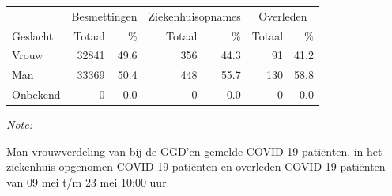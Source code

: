 \documentclass[
  english,
  man,floatsintext]{apa6}
\begin{document}
\begin{table}
\centering\begingroup\fontsize{11}{13}\selectfont

\begin{threeparttable}
\begin{tabular}{lrrrrrr}
\toprule
\multicolumn{1}{c}{ } & \multicolumn{2}{c}{Besmettingen} & \multicolumn{2}{c}{Ziekenhuisopnames} & \multicolumn{2}{c}{Overleden} \\
\cmidrule(l{3pt}r{3pt}){2-3} \cmidrule(l{3pt}r{3pt}){4-5} \cmidrule(l{3pt}r{3pt}){6-7}
Geslacht & Totaal & \% & Totaal & \% & Totaal & \%\\
\midrule
Vrouw & 32841 & 49.6 & 356 & 44.3 & 91 & 41.2\\
Man & 33369 & 50.4 & 448 & 55.7 & 130 & 58.8\\
Onbekend & 0 & 0.0 & 0 & 0.0 & 0 & 0.0\\
\bottomrule
\end{tabular}
\begin{tablenotes}
\item \textit{Note: } 
\item Man-vrouwverdeling van bij de GGD’en gemelde COVID-19 patiënten, in het ziekenhuis opgenomen COVID-19 patiënten en overleden COVID-19 patiënten van 09 mei t/m 23 mei 10:00 uur.
\end{tablenotes}
\end{threeparttable}
\endgroup{}
\end{table}
\newpage
\end{document}
